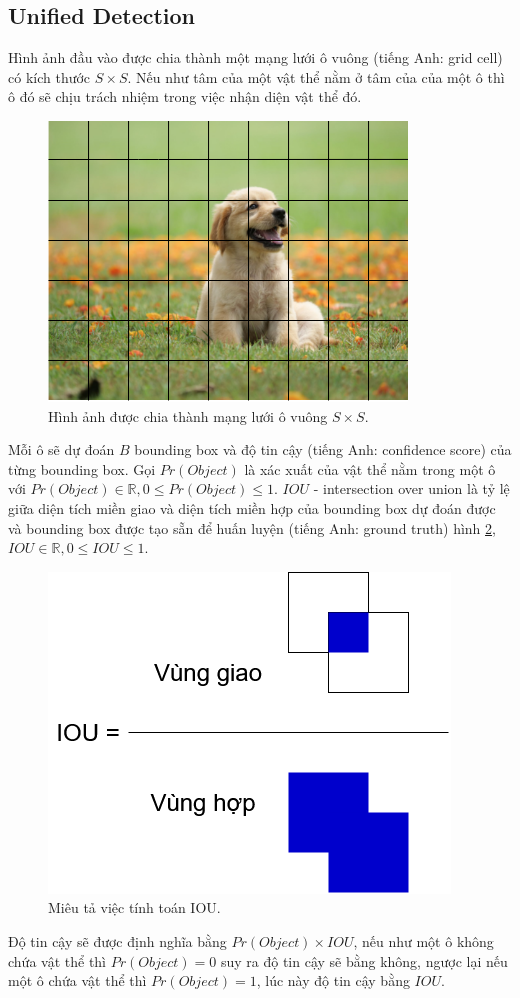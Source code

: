 \subsection{Unified Detection}
Hình ảnh đầu vào được chia thành một mạng lưới ô vuông (tiếng Anh: grid cell) có kích thước $S \times S$. Nếu như tâm của một vật thể nằm ở tâm của của một ô thì ô đó sẽ chịu trách nhiệm trong việc nhận diện vật thể đó.
\begin{figure}[ht!]
	\centerline{\includegraphics[scale=0.6]{images/grid_cell.png}}
  	\caption{Hình ảnh được chia thành mạng lưới ô vuông $S \times S$.}
  	\label{fig:grid_cell}
\end{figure}
Mỗi ô sẽ dự đoán $B$ bounding box và độ tin cậy (tiếng Anh: confidence score) của từng bounding box. Gọi $Pr(Object)$ là xác xuất của vật thể nằm trong một ô với $Pr(Object) \in \mathbb{R}, 0 \leq Pr(Object) \leq 1$. $IOU$ - intersection over union là tỷ lệ giữa diện tích miền giao và diện tích miền hợp của bounding box dự đoán được và bounding box được tạo sẵn để huấn luyện (tiếng Anh: ground truth) hình \ref{fig:iou}, $IOU \in \mathbb{R}, 0 \leq IOU \leq 1$.
\begin{figure}[ht!]
	\centerline{\includegraphics[scale=0.6]{images/iou.png}}
  	\caption{Miêu tả việc tính toán IOU.}
  	\label{fig:iou}
\end{figure}
Độ tin cậy sẽ được định nghĩa bằng $Pr(Object) \times IOU$, nếu như một ô không chứa vật thể thì $Pr(Object)=0$ suy ra độ tin cậy sẽ bằng không, ngược lại nếu một ô chứa vật thể thì $Pr(Object)=1$, lúc này độ tin cậy bằng $IOU$.

